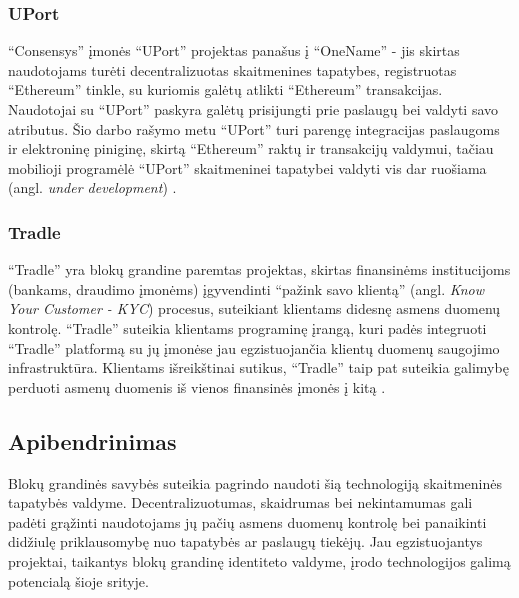 \subsubsection{UPort}

\enquote{Consensys} įmonės \enquote{UPort} projektas panašus į \enquote{OneName} - jis skirtas naudotojams turėti decentralizuotas
skaitmenines tapatybes, registruotas \enquote{Ethereum} tinkle, su kuriomis galėtų atlikti \enquote{Ethereum} transakcijas.
Naudotojai su \enquote{UPort} paskyra
galėtų prisijungti prie paslaugų bei valdyti savo atributus. Šio darbo rašymo metu \enquote{UPort} turi
parengę integracijas paslaugoms ir elektroninę piniginę, skirtą \enquote{Ethereum} raktų
ir transakcijų valdymui, tačiau mobilioji programėlė \enquote{UPort} skaitmeninei tapatybei valdyti vis dar ruošiama (angl.
\textit{under development}) \cite{UPort}.

\subsubsection{Tradle}

\enquote{Tradle} yra blokų grandine paremtas projektas, skirtas finansinėms institucijoms (bankams,
draudimo įmonėms) įgyvendinti \enquote{pažink savo klientą} (angl. \textit{Know Your Customer - KYC}) procesus,
suteikiant klientams didesnę asmens duomenų kontrolę. \enquote{Tradle} suteikia
klientams programinę įrangą, kuri padės integruoti \enquote{Tradle} platformą su jų įmonėse jau egzistuojančia klientų duomenų saugojimo
infrastruktūra. Klientams išreikštinai sutikus, \enquote{Tradle} taip pat suteikia galimybę perduoti asmenų duomenis iš vienos
finansinės įmonės į kitą \cite{Baars2016}.

\subsection{Apibendrinimas}

Blokų grandinės savybės suteikia pagrindo naudoti šią technologiją skaitmeninės tapatybės valdyme. Decentralizuotumas, skaidrumas
bei nekintamumas gali padėti grąžinti naudotojams jų pačių asmens duomenų kontrolę bei panaikinti didžiulę
priklausomybę nuo tapatybės ar paslaugų tiekėjų. Jau egzistuojantys projektai, taikantys blokų grandinę identiteto valdyme,
įrodo technologijos galimą potencialą šioje srityje.